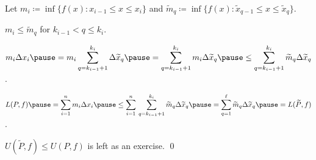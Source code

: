 \documentclass[10pt,aspectratio=169]{beamer}
\begin{document}
\begin{frame}


\pause
\medskip

Let
$m_i \coloneqq \inf \bigl\{ f(x) : x_{i-1} \leq x \leq x_i \bigr\}$
and
$\widetilde{m}_q \coloneqq \inf \bigl\{ f(x) : \widetilde{x}_{q-1} \leq x \leq
\widetilde{x}_q \bigr\}$.

\pause
\medskip

$m_i \leq \widetilde{m}_q$ for $k_{i-1} < q \leq k_i$.

\pause
\medskip

\thus\quad
$\displaystyle
m_i \Delta x_i
\pause
=
m_i \sum_{q=k_{i-1}+1}^{k_i} \Delta \widetilde{x}_q
\pause
=
\sum_{q=k_{i-1}+1}^{k_i} m_i \Delta \widetilde{x}_q
\pause
\leq
\sum_{q=k_{i-1}+1}^{k_i} \widetilde{m}_q \Delta \widetilde{x}_q$.

\pause
\medskip

\thus\quad
$\displaystyle
L(P,f)
\pause
=
\sum_{i=1}^n m_i \Delta x_i
\pause
\leq
\sum_{i=1}^n \,
\sum_{q=k_{i-1}+1}^{k_i} \widetilde{m}_q \Delta \widetilde{x}_q
\pause
=
\sum_{q=1}^{\ell}
\widetilde{m}_q \Delta \widetilde{x}_q
\pause
= L(\widetilde{P},f)$.

\pause
\medskip

$U(\widetilde{P},f) \leq U(P,f)$ is left as an exercise.
\qed

\end{frame}
\end{document}
